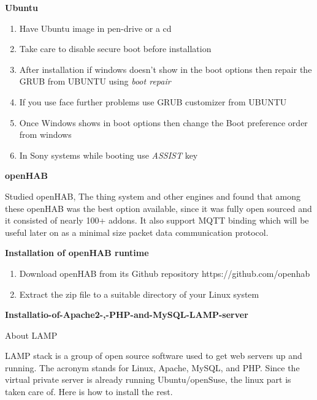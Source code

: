 \documentclass[16pt]{article}
\begin{document}
\begin{enumerate}
 
{\Large\item\textbf{Ubuntu}}
\hfill
  \begin{enumerate}
 
  \item
    Have Ubuntu image in pen-drive or a cd
  \item
    Take care to disable secure boot before installation
  \item
    After installation if windows doesn't show in the boot options then
    repair the GRUB from UBUNTU using \emph{boot repair}
  \item
    If you use face further problems use GRUB customizer from UBUNTU
  \item
    Once Windows shows in boot options then change the Boot preference
    order from windows
  \item
    In Sony systems while booting use \emph{ASSIST} key
  \end{enumerate}
  
\hfill
{\Large\item\textbf{openHAB}}



Studied openHAB, The thing system and other engines and found that among these openHAB was the best option available, since it was fully open sourced and it
consisted of nearly 100+ addons. It also support MQTT binding which will be useful later on as a minimal size packet data communication protocol.

\hfill

\textbf{Installation of openHAB runtime}

\begin{enumerate}

  \item Download openHAB from its Github repository https://github.com/openhab
  \item Extract the zip file to a suitable directory of your Linux system

  \end{enumerate}

{\Large\item\textbf{Installatio-of-Apache2-,-PHP-and-MySQL-LAMP-server}} 

{\Large{About LAMP}}

  LAMP stack is a group of open source software used to get web servers up
  and running. The acronym stands for Linux, Apache, MySQL, and PHP. Since
  the virtual private server is already running Ubuntu/openSuse, the linux
  part is taken care of. Here is how to install the rest.



\end{enumerate}
\end{document}

